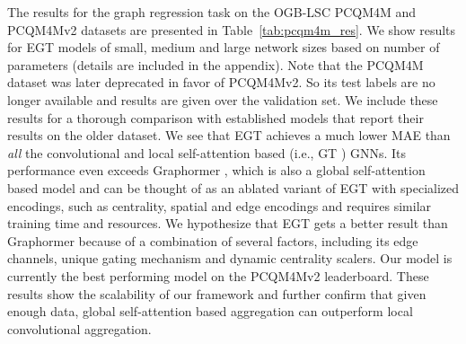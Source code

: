 \documentclass[sigconf,authorversion]{acmart}
\begin{document}
The results for the graph regression task on the OGB-LSC PCQM4M and PCQM4Mv2 datasets \cite{hu2021ogb} are presented in Table~\ref{tab:pcqm4m_res}. We show results for EGT models of small, medium and large network sizes based on number of parameters (details are included in the appendix). Note that the PCQM4M dataset was later deprecated in favor of PCQM4Mv2. So its test labels are no longer available and results are given over the validation set. We include these results for a thorough comparison with established models that report their results on the older dataset. We see that EGT achieves a much lower MAE than \emph{all} the convolutional and local self-attention based (i.e., GT \citeGT) GNNs. Its performance even exceeds Graphormer \citep{ying2021transformers}, which is also a global self-attention based model and can be thought of as an ablated variant of EGT with specialized encodings, such as centrality, spatial and edge encodings and requires similar training time and resources. We hypothesize that EGT gets a better result than Graphormer because of a combination of several factors, including its edge channels, unique gating mechanism and dynamic centrality scalers. Our model is currently the best performing model on the PCQM4Mv2 leaderboard. These results show the scalability of our framework and further confirm that given enough data, global self-attention based aggregation can outperform local convolutional aggregation.
\end{document}
